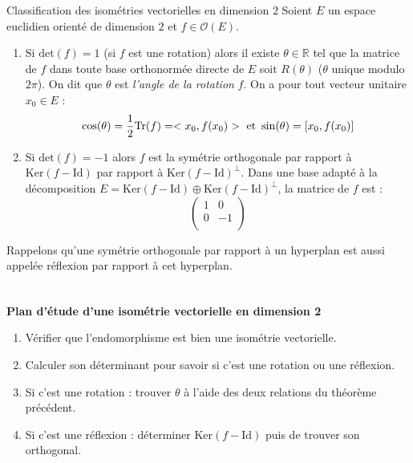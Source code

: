 \documentclass[french,11pt,twoside]{VcCours}
\begin{document}
\begin{Theoreme}{Classification des isométries vectorielles en dimension $2$}
Soient $E$ un espace euclidien orienté de dimension $2$ et $f \in \mathcal{O}(E)$.
\begin{enumerate}
\item Si $\textrm{det}(f)=1$ (si $f$ est une rotation) alors il existe $\theta \in \mathbb{R}$ tel que la matrice de $f$ dans toute base orthonormée directe de $E$ soit $R(\theta)$ ($\theta$ unique modulo $2 \pi$). On dit que $\theta$ est \emph{l'angle de la rotation} $f$. On a pour tout vecteur unitaire $x_0 \in E$ :
$$ \cos(\theta) = \dfrac{1}{2} \textrm{Tr}(f)=<x_0,f(x_0)> \hbox{ et } \sin(\theta) = [x_0, f(x_0) ]$$
\item Si $\textrm{det}(f) = -1$ alors $f$ est la symétrie orthogonale par rapport à $\textrm{Ker}(f-\textrm{Id})$ par rapport à $\textrm{Ker}(f-\textrm{Id})^{\perp}$. Dans une base adapté à la décomposition $E= \textrm{Ker}(f-\textrm{Id}) \oplus \textrm{Ker}(f-\textrm{Id})^{\perp}$, la matrice de $f$ est :
$$ \begin{pmatrix}
1 & 0 \\
0 & -1 \\
\end{pmatrix}$$
\end{enumerate}
\end{Theoreme}

\begin{Remarque}{} Rappelons qu'une symétrie orthogonale par rapport à un hyperplan est aussi appelée réflexion par rapport à cet hyperplan.
\end{Remarque}

\begin{Demonstration}{}
\vspace{14cm}
\end{Demonstration}

\newpage

$\phantom{tes}$

\vspace{15cm}



\begin{center}
\textbf{Plan d'étude d'une isométrie vectorielle en dimension 2}
\end{center}

\begin{enumerate}
\item Vérifier que l'endomorphisme est bien une isométrie vectorielle.
\item Calculer son déterminant pour savoir si c'est une rotation ou une réflexion.
\item Si c'est une rotation : trouver $\theta$ à l'aide des deux relations du théorème précédent.
\item Si c'est une réflexion : déterminer $\textrm{Ker}(f-\textrm{Id})$ puis de trouver son orthogonal.
\end{enumerate}
\end{document}
